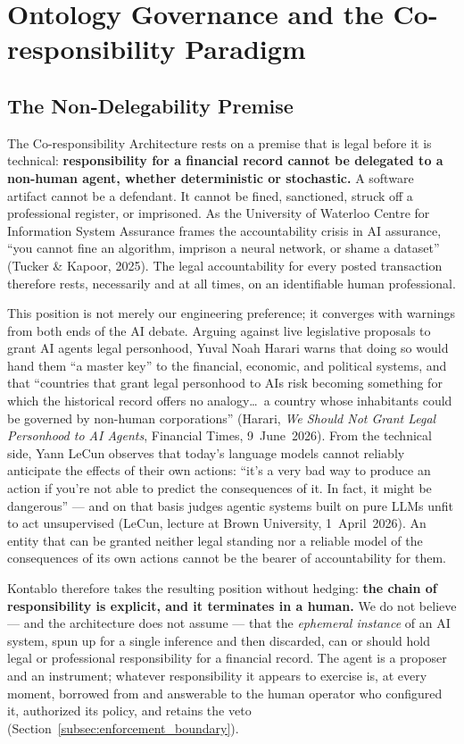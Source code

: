 \section{Ontology Governance and the Co-responsibility Paradigm}
\label{sec:governance}

\subsection{The Non-Delegability Premise}
\label{subsec:non_delegability}

The Co-responsibility Architecture rests on a premise that is legal before it
is technical: \textbf{responsibility for a financial record cannot be delegated
to a non-human agent, whether deterministic or stochastic.} A software
artifact cannot be a defendant. It cannot be fined, sanctioned, struck off a
professional register, or imprisoned. As the University of Waterloo Centre for
Information System Assurance frames the accountability crisis in AI assurance,
``you cannot fine an algorithm, imprison a neural network, or shame a
dataset'' (Tucker \& Kapoor, 2025). The legal accountability for every posted
transaction therefore rests, necessarily and at all times, on an identifiable
human professional.

This position is not merely our engineering preference; it converges with
warnings from both ends of the AI debate. Arguing against live legislative
proposals to grant AI agents legal personhood, Yuval Noah Harari warns that doing
so would hand them ``a master key'' to the financial, economic, and political
systems, and that ``countries that grant legal personhood to AIs risk becoming
something for which the historical record offers no analogy\dots\ a country whose
inhabitants could be governed by non-human corporations'' (Harari, \emph{We
Should Not Grant Legal Personhood to AI Agents}, Financial Times, 9~June~2026).
From the technical side, Yann LeCun observes that today's language models cannot
reliably anticipate the effects of their own actions: ``it's a very bad way to
produce an action if you're not able to predict the consequences of it. In fact,
it might be dangerous'' --- and on that basis judges agentic systems built on
pure LLMs unfit to act unsupervised (LeCun, lecture at Brown University,
1~April~2026). An entity that can be granted neither legal standing nor a reliable
model of the consequences of its own actions cannot be the bearer of
accountability for them.

Kontablo therefore takes the resulting position without hedging: \textbf{the
chain of responsibility is explicit, and it terminates in a human.} We do not
believe --- and the architecture does not assume --- that the \emph{ephemeral
instance} of an AI system, spun up for a single inference and then discarded, can
or should hold legal or professional responsibility for a financial record. The
agent is a proposer and an instrument; whatever responsibility it appears to
exercise is, at every moment, borrowed from and answerable to the human operator
who configured it, authorized its policy, and retains the veto
(Section~\ref{subsec:enforcement_boundary}).

